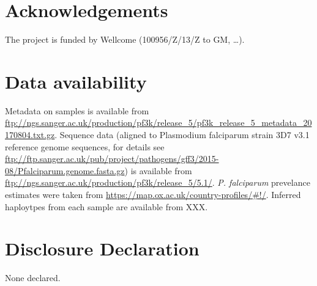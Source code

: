 \documentclass[9pt,lineno]{elife}
\begin{document}
\section{Acknowledgements}
The project is funded by  Wellcome (100956/Z/13/Z to GM, \ldots).


\section{Data availability}
Metadata on samples is available from \url{ftp://ngs.sanger.ac.uk/production/pf3k/release_5/pf3k_release_5_metadata_20170804.txt.gz}.  Sequence data (aligned to Plasmodium falciparum strain 3D7 v3.1 reference genome sequences, for details see \url{      ftp://ftp.sanger.ac.uk/pub/project/pathogens/gff3/2015-08/Pfalciparum.genome.fasta.gz}) is available from  \url{ftp://ngs.sanger.ac.uk/production/pf3k/release_5/5.1/}.  {\it P. falciparum} prevelance estimates were taken from \url{https://map.ox.ac.uk/country-profiles/#!/}.  Inferred haploytpes from each sample are available from XXX.


\section{Disclosure Declaration}
None declared.



\end{document}
